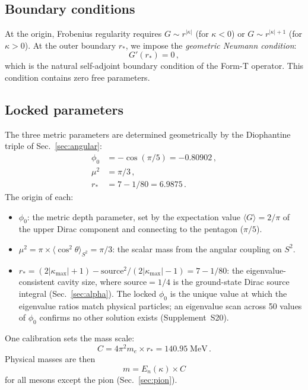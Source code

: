 \documentclass[aps,prd,twocolumn,superscriptaddress,nofootinbib,longbibliography]{revtex4-2}
\newcommand{\rstar}{r_{*}}
\newcommand{\phiz}{\phi_0}
\newcommand{\kmax}{|\kappa_{\mathrm{max}}|}
\begin{document}
\subsection{Boundary conditions}

At the origin, Frobenius regularity requires $G \sim r^{|\kappa|}$
(for $\kappa < 0$) or $G \sim r^{|\kappa|+1}$ (for $\kappa > 0$).
At the outer boundary $\rstar$, we impose the \emph{geometric Neumann
condition}:
\begin{equation}\label{eq:neumann}
  G'(\rstar) = 0\,,
\end{equation}
which is the natural self-adjoint boundary condition of the Form-T
operator.  This condition contains zero free parameters.

\subsection{Locked parameters}\label{sec:params}

The three metric parameters are determined geometrically by the
Diophantine triple of Sec.~\ref{sec:angular}:
\begin{align}
  \phiz &= -\cos(\pi/5) = -0.80902\,, \label{eq:phi0}\\
  \mu^2 &= \pi/3\,, \label{eq:mu2}\\
  \rstar &= 7 - 1/80 = 6.9875\,. \label{eq:rstar}
\end{align}
The origin of each:
\begin{itemize}
\item $\phiz$: the metric depth parameter, set by the expectation
  value $\langle G \rangle = 2/\pi$ of the upper Dirac component and
  connecting to the pentagon ($\pi/5$).
\item $\mu^2 = \pi \times \langle\cos^2\theta\rangle_{S^2} = \pi/3$:
  the scalar mass from the angular coupling on $S^2$.
\item $\rstar = (2\kmax + 1) - \mathrm{source}^2/(2\kmax - 1)
  = 7 - 1/80$: the eigenvalue-consistent cavity size, where
  $\mathrm{source} = 1/4$ is the ground-state Dirac source integral
  (Sec.~\ref{sec:alpha}).  The locked $\phiz$ is the unique value at
  which the eigenvalue ratios match physical particles; an eigenvalue
  scan across 50 values of $\phiz$ confirms no other solution exists
  (Supplement~S20).
\end{itemize}
One calibration sets the mass scale:
\begin{equation}\label{eq:C}
  C = 4\pi^2 m_e \times \rstar = 140.95\;\mathrm{MeV}\,.
\end{equation}
Physical masses are then
\begin{equation}\label{eq:massformula}
  m = E_n(\kappa) \times C
\end{equation}
for all mesons except the pion (Sec.~\ref{sec:pion}).
\end{document}
